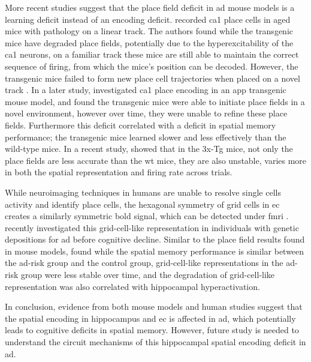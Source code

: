 More recent studies suggest that the place field deficit in \gls{ad} mouse models is a learning deficit instead of an encoding deficit. \citet{cheng13} recorded \gls{ca1} place cells in aged mice with \atau{} pathology on a linear track. The authors found while the transgenic mice have degraded place fields, potentially due to the hyperexcitability of the \gls{ca1} neurons, on a familiar track these mice are still able to maintain the correct sequence of firing, from which the mice's position can be decoded. However, the transgenic mice failed to form new place cell trajectories when placed on a novel track \citep{cheng13}. In a later study, \citet{zhao14} investigated \gls{ca1} place encoding in an \gls{app} transgenic mouse model, and found the transgenic mice were able to initiate place fields in a novel environment, however over time, they were unable to refine these place fields. Furthermore this deficit correlated with a deficit in spatial memory performance; the transgenic mice learned slower and less effectively than the wild-type mice. In a recent study, \citet{mably17} showed that in the 3x-Tg mice, not only the place fields are less accurate than the \gls{wt} mice, they are also unstable, varies more in both the spatial representation and firing rate across trials. 

While neuroimaging techniques in humans are unable to resolve single cells activity and identify place cells, the hexagonal symmetry of grid cells in \gls{ec} creates a similarly symmetric \gls{bold} signal, which can be detected under \gls{fmri} \citep{doeller10}. \citet{kunz15} recently investigated this grid-cell-like representation in individuals with genetic depositions for \gls{ad} before cognitive decline. Similar to the place field results found in mouse models, \citet{kunz15} found while the spatial memory performance is similar between the \gls{ad}-risk group and the control group, grid-cell-like representations in the \gls{ad}-risk group were less stable over time, and the degradation of grid-cell-like representation was also correlated with hippocampal hyperactivation. 

In conclusion, evidence from both mouse models and human studies suggest that the spatial encoding in hippocampus and \gls{ec} is affected in \gls{ad}, which potentially leads to cognitive deficits in spatial memory. However, future study is needed to understand the circuit mechanisms of this hippocampal spatial encoding deficit in \gls{ad}.

